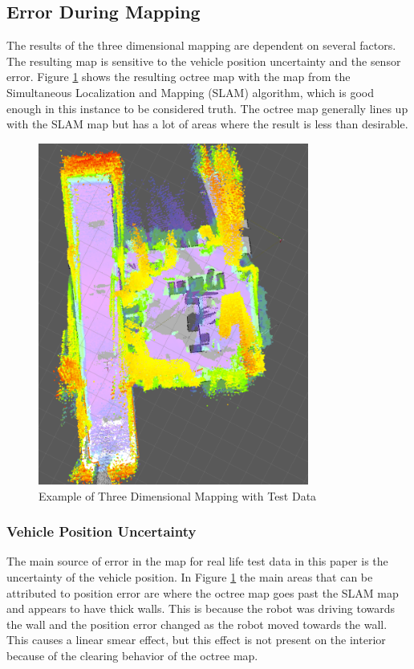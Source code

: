 \documentclass[journal]{IEEEtran}
\begin{document}
  \subsection{Error During Mapping}
  The results of the three dimensional mapping are dependent on several
  factors. The resulting map is sensitive to the vehicle position uncertainty
  and the sensor error. Figure \ref{fig:slamvsoctree} shows the resulting
  octree map with the map from the Simultaneous Localization and Mapping
  (SLAM) algorithm, which is good enough in this instance to be considered
  truth. The octree map generally lines up with the SLAM map but has a lot of
  areas where the result is less than desirable.
  
  \begin{figure}[here]
    \centering
    \includegraphics[width=3.5in,keepaspectratio]{slamvsoctree.pdf}
    \caption{Example of Three Dimensional Mapping with Test Data}
    \label{fig:slamvsoctree}
  \end{figure}
  
  \subsubsection{Vehicle Position Uncertainty}
  The main source of error in the map for real life test data in this paper is
  the uncertainty of the vehicle position. In Figure \ref{fig:slamvsoctree}
  the main areas that can be attributed to position error are where the octree
  map goes past the SLAM map and appears to have thick walls. This is because
  the robot was driving towards the wall and the position error changed as the
  robot moved towards the wall. This causes a linear smear effect, but this
  effect is not present on the interior because of the clearing behavior of
  the octree map.
  
\end{document}
